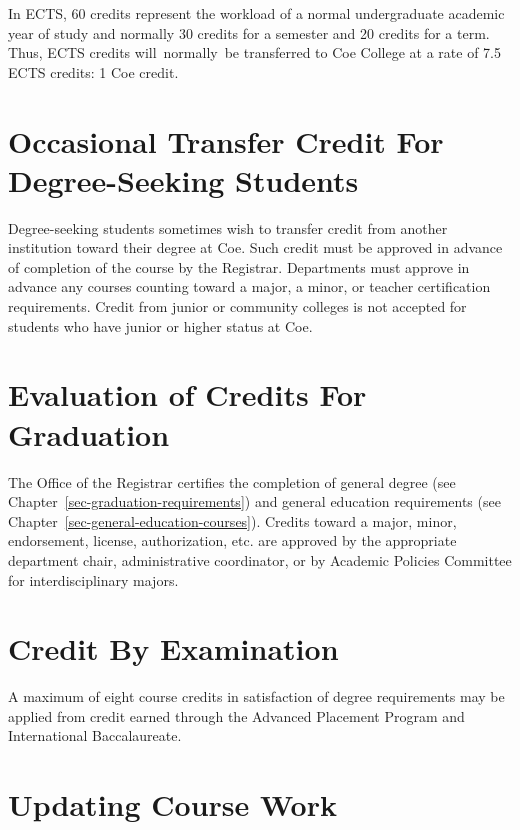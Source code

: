 \documentclass[
  letterpaper,
]{scrbook}
\begin{document}
In ECTS, 60 credits represent the workload of a normal undergraduate
academic year of study and normally 30 credits for a semester and 20
credits for a term. Thus, ECTS credits will~normally~be transferred to
Coe College at a rate of 7.5 ECTS credits: 1 Coe credit.

\section{Occasional Transfer Credit For Degree-Seeking
Students}\label{occasional-transfer-credit-for-degree-seeking-students}

Degree-seeking students sometimes wish to transfer credit from another
institution toward their degree at Coe. Such credit must be approved in
advance of completion of the course by the Registrar. Departments must
approve in advance any courses counting toward a major, a minor, or
teacher certification requirements. Credit from junior or community
colleges is not accepted for students who have junior or higher status
at Coe.

\section{Evaluation of Credits For
Graduation}\label{evaluation-of-credits-for-graduation}

The Office of the Registrar certifies the completion of general degree
(see Chapter~\ref{sec-graduation-requirements}) and general education
requirements (see Chapter~\ref{sec-general-education-courses}). Credits
toward a major, minor, endorsement, license, authorization, etc. are
approved by the appropriate department chair, administrative
coordinator, or by Academic Policies Committee for interdisciplinary
majors.

\section{Credit By Examination}\label{credit-by-examination}

A maximum of eight course credits in satisfaction of degree requirements
may be applied from credit earned through the Advanced Placement Program
and International Baccalaureate.

\section{Updating Course Work}\label{updating-course-work}
\end{document}
